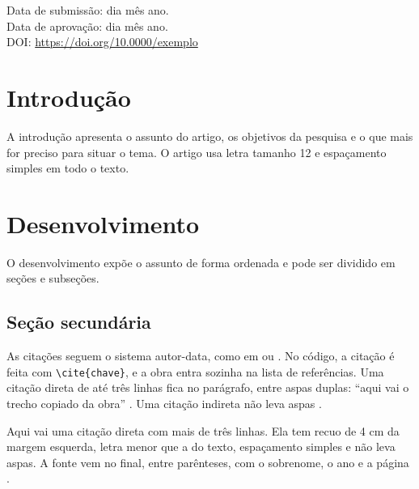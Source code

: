 \documentclass[12pt,a4paper,oneside]{article}
\begin{document}
\par\vspace{\baselineskip}\noindent
Data de submissão: dia mês ano.\\
Data de aprovação: dia mês ano.\\
DOI: \url{https://doi.org/10.0000/exemplo}


\section{Introdução}

A introdução apresenta o assunto do artigo, os objetivos da pesquisa e o que mais for preciso para situar o tema. O artigo usa letra tamanho 12 e espaçamento simples em todo o texto.

\section{Desenvolvimento}

O desenvolvimento expõe o assunto de forma ordenada e pode ser dividido em seções e subseções.

\subsection{Seção secundária}

As citações seguem o sistema autor-data, como em \cite[p.~15]{livro2024} ou . No código, a citação é feita com \texttt{\textbackslash cite\{chave\}}, e a obra entra sozinha na lista de referências. Uma citação direta de até três linhas fica no parágrafo, entre aspas duplas: “aqui vai o trecho copiado da obra” \cite[p.~32]{livro2024}. Uma citação indireta não leva aspas \cite{artigo2025}.

\begin{citacao}
Aqui vai uma citação direta com mais de três linhas. Ela tem recuo de 4 cm da margem esquerda, letra menor que a do texto, espaçamento simples e não leva aspas. A fonte vem no final, entre parênteses, com o sobrenome, o ano e a página \cite[p.~47]{capitulo2023}.
\end{citacao}
\end{document}
